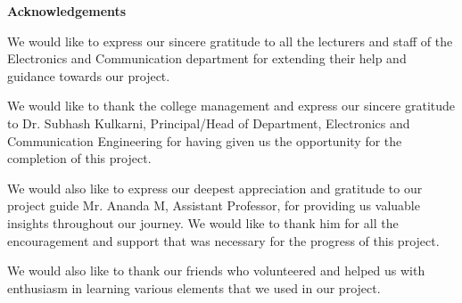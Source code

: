 \begin{center}
\thispagestyle{empty}
\LARGE{\textbf{Acknowledgements}}\\[1cm]
\end{center}
\linespread{1.13}

\begin{large}
We would like to express our sincere gratitude to all the lecturers and staff of the Electronics and Communication department for extending their help and guidance towards our project.
\newline

We would like to thank the college management and express our sincere gratitude to Dr. Subhash Kulkarni, Principal/Head of Department, Electronics and Communication Engineering for having given us the opportunity for the completion of this project.
\newline

We would also like to express our deepest appreciation and gratitude to our project guide Mr. Ananda M, Assistant Professor, for providing us valuable insights throughout our journey. We would like to thank him for all the encouragement and support that was necessary for the progress of this project.
\newline

We would also like to thank our friends who volunteered and helped us with enthusiasm in learning various elements that we used in our project. 
\end{large}